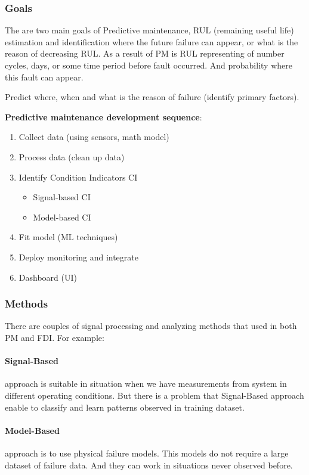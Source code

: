 \documentclass[class=article, crop=false]{standalone}
\begin{document}
\subsubsection{Goals}
The are two main goals of Predictive maintenance, RUL (remaining useful
life) estimation and identification where the future failure can appear, or what is
the reason of decreasing RUL. 
As a result of PM is RUL representing of number cycles, days, or some time
period before fault occurred. And probability where this fault can appear.

Predict where, when and what is the reason of failure (identify primary
factors).


\textbf{Predictive maintenance development sequence}:
\begin{enumerate}
    \item{Collect data (using sensors, math model)}
    \item{Process data (clean up data)}
    \item{Identify Condition Indicators CI}
        \begin{itemize}
            \item{Signal-based CI}
            \item{Model-based CI}
        \end{itemize}
    \item{Fit model (ML techniques)}
    \item{Deploy monitoring and integrate}
    \item{Dashboard (UI)}
\end{enumerate}


\subsubsection{Methods}
There are couples of signal processing and analyzing methods that used in
both PM and FDI. For example:

\paragraph{Signal-Based} approach is suitable in situation when we have
measurements from system in different operating conditions. 
But there is a problem that Signal-Based approach enable to classify and
learn patterns observed in training dataset. 


\paragraph{Model-Based} approach is to use physical failure models. This
models do not require a large dataset of failure data. And they can work in
situations never observed before. 
\end{document}
